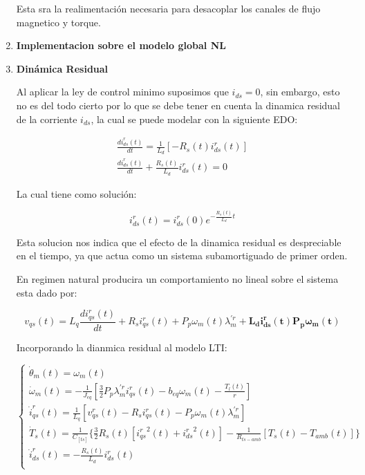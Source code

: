 \documentclass{article}
\begin{document}
\begin{enumerate}[label=\roman*.]
    Esta sra la realimentación necesaria para desacoplar los canales de flujo magnetico y torque.

    \item \textbf{Implementacion sobre el modelo global NL}


    \item \textbf{Dinámica Residual}
    
    Al aplicar la ley de control minimo suposimos que $i_{ds} = 0$, sin embargo, esto no es del todo cierto
    por lo que se debe tener en cuenta la dinamica residual de la corriente $i_{ds}$, la cual se puede
    modelar con la siguiente EDO:

    \begin{equation*}
        \begin{aligned}
        \frac{di_{ds}^r(t)}{dt} = \frac{1}{L_{d}}[-R_{s}(t)i_{ds}^r(t)] \\
        \frac{di_{ds}^r(t)}{dt} + \frac{R_{s}(t)}{L_{d}}i_{ds}^r(t) = 0 
        \end{aligned}
    \end{equation*} 

    La cual tiene como solución:

    \begin{equation}
        i_{ds}^r(t) = i_{ds}^r(0)e^{-\frac{R_{s}(t)}{L_{d}}t}
    \end{equation}

    Esta solucion nos indica que el efecto de la dinamica residual es despreciable en el tiempo, ya que actua como
    un sistema subamortiguado de primer orden.

    En regimen natural producira un comportamiento no lineal sobre el sistema esta dado por:

    \begin{equation}\label{eq.dinamica_residual}
        v_{qs}(t) = L_{q}\frac{di_{qs}^r(t)}{dt} + R_{s}i_{qs}^r(t) + P_{p}\omega_{m}(t)\lambda_{m}^{\prime r} + \mathbf{L_{d}i_{ds}^r(t)P_{p}\omega_{m}(t)}
    \end{equation}

    Incorporando la dianmica residual al modelo LTI:

    \begin{equation}
        \begin{cases}
            \dot{\theta}_{m}(t) = \omega_{m}(t)\\
            \dot{\omega}_{m}(t) = -\frac{1}{J_{eq}}[\frac{3}{2}P_{p}\lambda_{m}^{\prime r} i_{qs}^r(t) - b_{eq}\omega_{m}(t)-\frac{T_{l}(t)}{r}]\\
            \dot{i}_{qs}^r(t) = \frac{1}{L_{q}}[v_{qs}^r(t) - R_{s}i_{qs}^r(t) - P_{p}\omega_{m}(t)\lambda_{m}^{\prime r}]\\
            \dot{T}_{s}(t) = \frac{1}{C_[ts]}\{\frac{3}{2}R_{s}(t)[{i_{qs}^r}^2(t) + {i_{ds}^r}^2(t)] - \frac{1}{R_{ts-amb}}[T_{s}(t) - T_{amb}(t)]\}\\
            \dot{i}_{ds}^r(t) = -\frac{R_{s}(t)}{L_{d}}i_{ds}^r(t) \\
        \end{cases}    
    \end{equation}


\end{enumerate}
\end{document}
